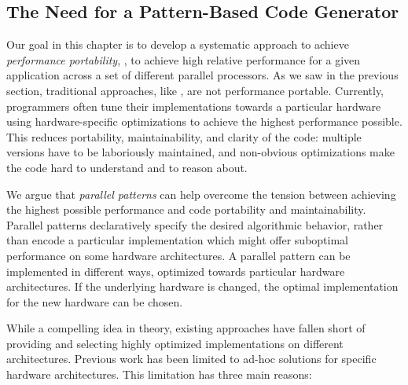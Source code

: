 

\subsection{The Need for a Pattern-Based Code Generator}

Our goal in this chapter is to develop a systematic approach to achieve \emph{performance portability}, \ie, to achieve high relative performance for a given application across a set of different parallel processors.
As we saw in the previous section, traditional approaches, like \OpenCL, are not performance portable.
Currently, programmers often tune their implementations towards a particular hardware using hardware-specific optimizations to achieve the highest performance possible.
This reduces portability, maintainability, and clarity of the code:
multiple versions have to be laboriously maintained, and non-obvious optimizations make the code hard to understand and to reason about.

We argue that \emph{parallel patterns} can help overcome the tension between achieving the highest possible performance and code portability and maintainability.
Parallel patterns declaratively specify the desired algorithmic behavior, rather than encode a particular implementation which might offer suboptimal performance on some hardware architectures.
A parallel pattern can be implemented in different ways, optimized towards particular hardware architectures.
If the underlying hardware is changed, the optimal implementation for the new hardware can be chosen.

While a compelling idea in theory, existing approaches have fallen short of providing and selecting highly optimized implementations on different architectures.
Previous work has been limited to ad-hoc solutions for specific hardware architectures.
This limitation has three main reasons:

